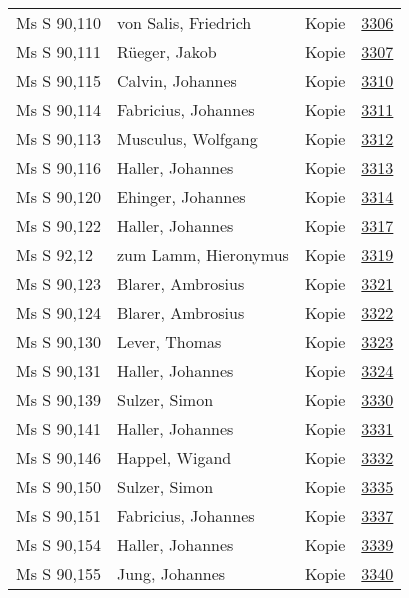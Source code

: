 \documentclass[10pt,a4paper,landscape]{report}
\begin{document}
\begin{longtable}{p{16cm}p{4cm}lr}
Ms S 90,110	&	von Salis, Friedrich	&	Kopie	&	\href{http://130.60.24.72/assignment/3306}{3306}\\
Ms S 90,111	&	Rüeger, Jakob	&	Kopie	&	\href{http://130.60.24.72/assignment/3307}{3307}\\
Ms S 90,115	&	Calvin, Johannes	&	Kopie	&	\href{http://130.60.24.72/assignment/3310}{3310}\\
Ms S 90,114	&	Fabricius, Johannes	&	Kopie	&	\href{http://130.60.24.72/assignment/3311}{3311}\\
Ms S 90,113	&	Musculus, Wolfgang	&	Kopie	&	\href{http://130.60.24.72/assignment/3312}{3312}\\
Ms S 90,116	&	Haller, Johannes	&	Kopie	&	\href{http://130.60.24.72/assignment/3313}{3313}\\
Ms S 90,120	&	Ehinger, Johannes	&	Kopie	&	\href{http://130.60.24.72/assignment/3314}{3314}\\
Ms S 90,122	&	Haller, Johannes	&	Kopie	&	\href{http://130.60.24.72/assignment/3317}{3317}\\
Ms S 92,12	&	zum Lamm, Hieronymus	&	Kopie	&	\href{http://130.60.24.72/assignment/3319}{3319}\\
Ms S 90,123	&	Blarer, Ambrosius	&	Kopie	&	\href{http://130.60.24.72/assignment/3321}{3321}\\
Ms S 90,124	&	Blarer, Ambrosius	&	Kopie	&	\href{http://130.60.24.72/assignment/3322}{3322}\\
Ms S 90,130	&	Lever, Thomas	&	Kopie	&	\href{http://130.60.24.72/assignment/3323}{3323}\\
Ms S 90,131	&	Haller, Johannes	&	Kopie	&	\href{http://130.60.24.72/assignment/3324}{3324}\\
Ms S 90,139	&	Sulzer, Simon	&	Kopie	&	\href{http://130.60.24.72/assignment/3330}{3330}\\
Ms S 90,141	&	Haller, Johannes	&	Kopie	&	\href{http://130.60.24.72/assignment/3331}{3331}\\
Ms S 90,146	&	Happel, Wigand	&	Kopie	&	\href{http://130.60.24.72/assignment/3332}{3332}\\
Ms S 90,150	&	Sulzer, Simon	&	Kopie	&	\href{http://130.60.24.72/assignment/3335}{3335}\\
Ms S 90,151	&	Fabricius, Johannes	&	Kopie	&	\href{http://130.60.24.72/assignment/3337}{3337}\\
Ms S 90,154	&	Haller, Johannes	&	Kopie	&	\href{http://130.60.24.72/assignment/3339}{3339}\\
Ms S 90,155	&	Jung, Johannes	&	Kopie	&	\href{http://130.60.24.72/assignment/3340}{3340}\\

\end{longtable}
\end{document}
